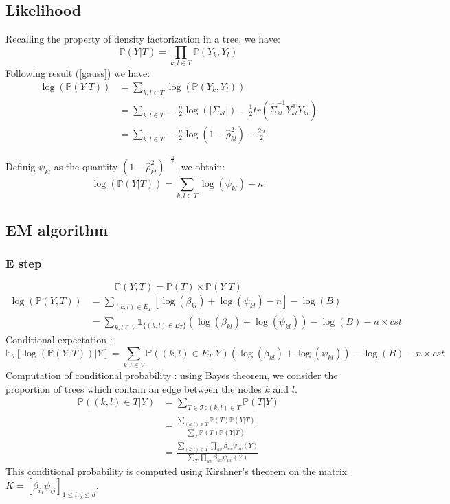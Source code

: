 \documentclass[a4paper,11pt]{article}
\begin{document}
  \subsection{Likelihood}
  Recalling the property of density factorization in a tree, we have:
  \[\mathds{P}(Y|T) = \prod_{k,l\in T}\mathds{P}(Y_k,Y_l)\]
  Following result (\ref{gauss}) we have:
  \begin{align*}
   \log(\mathds{P}(Y|T)) &= \sum_{k,l\in T} \log(\mathds{P}(Y_k,Y_l))\\
   &= \sum_{k,l\in T} -\frac{n}{2} \log (|\Sigma_{kl}|) - \frac{1}{2}tr(\hat{\Sigma}_{kl}^{-1} Y_{kl}^{\text{T}}Y_{kl})\\
    &= \sum_{k,l\in T} -\frac{n}{2} \log (1-\hat{\rho}_{kl}^2) - \frac{2n}{2}
  \end{align*}

Definig $\psi_{kl}$ as the quantity $(1-\hat{\rho}_{kl}^2)^{-\frac{n}{2}}$, we obtain:
\[ \log(\mathds{P}(Y|T))=\sum_{k,l\in T} \log(\psi_{kl}) -n.\]

  \subsection{EM algorithm}
  \subsubsection{E step}
  \[ \mathds{P}(Y,T) = \mathds{P}(T)\times\mathds{P}(Y|T)\]
\begin{align*}
 \log(\mathds{P}(Y,T)) &= \sum_{(k,l)\in E_T} \left[ \log(\beta_{kl}) + \log(\psi_{kl}) -n \right] -\log(B) \\
 &= \sum_{k,l\in V} \mathds{1}_{\{(k,l) \in E_T\}} (\log(\beta_{kl}) + \log(\psi_{kl}) ) -\log(B) - n\times cst
 \end{align*}
  Conditional expectation :
\[ \mathds{E}_\theta[\log(\mathds{P}(Y,T))|Y] =\sum_{k,l\in V} \mathds{P}((k,l) \in E_T|Y) (\log(\beta_{kl}) + \log(\psi_{kl}) ) -\log(B) - n\times cst\]
  Computation of conditional probability : using Bayes theorem, we consider the proportion of trees which contain an edge between the nodes $k$ and $l$.
 \begin{align*}
  \mathds{P}((k,l)\in T | Y)&=\sum_{T\in \mathcal{T} : (k,l)\in T}\mathds{P}( T | Y) \\
  &= \frac{\sum_{(k,l)\in T} \mathds{P}(T)\mathds{P}(Y|T)}{\sum_{T} \mathds{P}(T)\mathds{P}(Y|T)}\\
 &=\frac{\sum_{(k,l)\in T} \prod_{uv} \beta_{uv}  \psi_{uv}(Y)}{\sum_{T} \prod_{uv} \beta_{uv} \psi_{uv}(Y)}
 \end{align*}
 This conditional probability is computed using Kirshner's theorem on the matrix $K = [\beta_{ij}\psi_{ij}]_{1\leq i, j\leq d}$.
\end{document}
